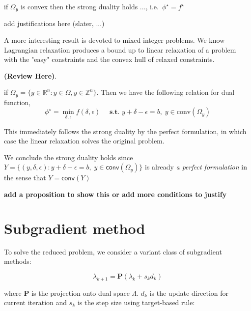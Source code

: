 \begin{theorem}
  if \(\Omega_y\) is convex then the strong duality holds ...,
  i.e.~\(\phi^\star = f^\star\)
\end{theorem}

add justifications here (slater, ...)

A more interesting result is devoted to mixed integer problems.
We know Lagrangian relaxation produces a bound up to
linear relaxation of a problem with the "easy" constraints
and the convex hull of relaxed constraints.

\textbf{(Review Here)}.

\begin{lemma}
  if \(\Omega_y = \{y \in \mathbb R^n: y \in \Omega, y\in \mathbb Z^n\}\).
  Then we have the following relation for dual function,
  \[ \phi^\star = \min_{\delta, \epsilon} f(\delta, \epsilon)\quad \textbf{ s.t. }  y + \delta - \epsilon = b,\; y \in \textrm{conv}(\Omega_y)\]
\end{lemma}

This immediately follows the strong duality by the perfect formulation,
in which case the linear relaxation solves the original problem.

\begin{corollary}\label{strong-ip}
  We conclude the strong duality holds since
  \(Y = \{(y, \delta, \epsilon): y + \delta - \epsilon = b,\; y \in \textsf{conv}(\Omega_y)\}\)
  is already \emph{a perfect formulation} in the sense that
  \(Y = \textsf{conv}(Y)\)
\end{corollary}

\textbf{add a proposition to show this or add more conditions to
  justify}


\hypertarget{subgradient-method}{%
  \section{Subgradient method}\label{subgradient-method}}

To solve the reduced problem, we consider a variant class of subgradient
methods:

\begin{equation}\lambda_{k+1} = \mathbf{P}(\lambda_{k} + s_{k}d_{k})\end{equation}

where \(\mathbf P\) is the projection onto dual space \(\Lambda\).
\(d_k\) is the update direction for current iteration and \(s_{k}\) is
the step size using target-based rule:

